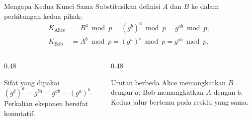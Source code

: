 \documentclass[aspectratio=169,11pt]{beamer}
\begin{document}
\begin{frame}{Mengapa Kedua Kunci Sama}
    \footnotesize
    Substitusikan definisi $A$ dan $B$ ke dalam perhitungan kedua pihak:
    \[
        \begin{aligned}
            K_{\text{Alice}}
                &= B^{a} \bmod p = (g^{b})^{a} \bmod p
                 = g^{ab} \bmod p, \\
            K_{\text{Bob}}
                &= A^{b} \bmod p = (g^{a})^{b} \bmod p
                 = g^{ab} \bmod p .
        \end{aligned}
    \]
    \vspace{0.1cm}
    \begin{columns}[T,onlytextwidth]
        \begin{column}{0.48\textwidth}
            \begin{block}{Sifat yang dipakai}
                \footnotesize
                $(g^{b})^{a} = g^{ba} = g^{ab} = (g^{a})^{b}$. Perkalian
                eksponen bersifat komutatif.
            \end{block}
        \end{column}
        \begin{column}{0.48\textwidth}
            \begin{exampleblock}{Urutan berbeda}
                \footnotesize
                Alice memangkatkan $B$ dengan $a$; Bob memangkatkan $A$
                dengan $b$. Kedua jalur bertemu pada residu yang sama.
            \end{exampleblock}
        \end{column}
    \end{columns}
\end{frame}
\end{document}
